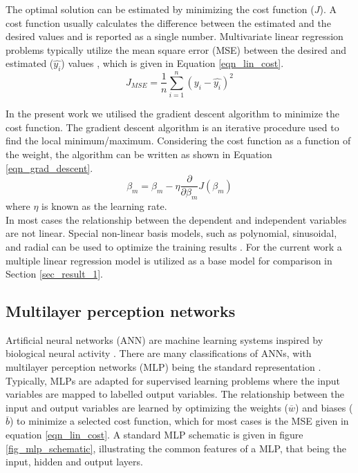 \documentclass[a4paper,fleqn]{cas-sc}
\begin{document}
The optimal solution can be estimated by minimizing the cost function ($J$). A cost function usually calculates the difference between the estimated and the desired values and is reported as a single number. Multivariate linear regression problems typically utilize the mean square error (MSE) between the desired and estimated ($\hat{y_i}$)  values \cite{Wheeler2019}, which is given in Equation \ref{eqn_lin_cost}.
 \begin{equation}\label{eqn_lin_cost}
J_{MSE}=\frac{1}{n}\sum^n_{i=1}(y_i-\hat{y_i})^2
\end{equation} 

In the present work we utilised the gradient descent algorithm \cite{Wen2022} to minimize the cost function. The gradient descent algorithm is an iterative procedure used to find the local minimum/maximum. Considering the cost function as a function of the weight, the algorithm can be written as shown in Equation \ref{eqn_grad_descent}.  
\begin{equation}\label{eqn_grad_descent}
\beta_{m} = \beta_m-\eta\frac{\partial}{\partial\beta_m}J(\beta_m)
\end{equation}
where $\eta$ is known as the learning rate.\\

In most cases the relationship between the dependent and independent variables are not linear. Special non-linear basis models, such as polynomial, sinusoidal, and radial can be used to optimize the training results \cite{Rasmussen2006}. For the current work a multiple linear regression model is utilized as a base model for comparison in Section \ref{sec_result_1}. 
\subsection{Multilayer perception networks}
Artificial neural networks (ANN) are machine learning systems inspired by biological neural activity \cite{Rasmussen2006}. There are many classifications of ANNs, with multilayer perception networks (MLP) being the standard representation \citep{goodfellow}. Typically, MLPs are adapted for supervised learning problems where the input variables are mapped to labelled output variables. The relationship between the input and output variables are learned by optimizing the weights ($\overline{w}$) and biases ($\overline{b}$) to minimize a selected cost function, which for most cases is the MSE given in equation \ref{eqn_lin_cost}. A standard MLP schematic is given in figure \ref{fig_mlp_schematic}, illustrating the common features of a MLP, that being the input, hidden and output layers.\\
\end{document}
